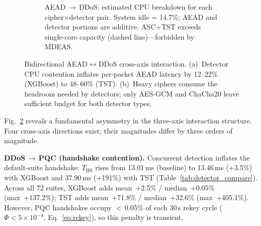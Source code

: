 \begin{figure}[t]
\begin{subfigure}[b]{\columnwidth}
{}%
\caption{AEAD\,$\to$\,DDoS: estimated CPU breakdown for each
  cipher$\times$detector pair.  System idle = 14.7\%; AEAD and
  detector portions are additive.  ASC+TST exceeds single-core
  capacity (dashed line)---forbidden by MDEAS.}
\label{fig:aead_to_ddos}
\end{subfigure}
\caption{Bidirectional AEAD$\leftrightarrow$DDoS cross-axis
  interaction.  (a)~Detector CPU contention inflates per-packet
  AEAD latency by 12--22\% (XGBoost) to 48--60\% (TST).
  (b)~Heavy ciphers consume the headroom needed by detectors;
  only AES-GCM and ChaCha20 leave sufficient budget for both
  detector types.}
\label{fig:cross_axis}
\end{figure}

Fig.~\ref{fig:cross_axis} reveals a fundamental asymmetry in the
three-axis interaction structure.  Four cross-axis directions exist;
their magnitudes differ by three orders of magnitude.

\medskip
\textbf{DDoS\,$\to$\,PQC (handshake contention).}\quad
Concurrent detection inflates the default-suite handshake:
$T_\text{HS}$ rises from 13.01\,ms (baseline) to 13.46\,ms
(+3.5\%) with XGBoost and 37.90\,ms (+191\%) with TST
(Table~\ref{tab:detector_compare}).  Across all 72 suites, XGBoost
adds mean~+2.5\% / median~+0.05\% (max~+137.2\%); TST
adds mean~+71.8\% / median~+32.6\% (max~+405.1\%).  However,
PQC handshakes occupy $<$\,0.05\% of each 30\,s rekey cycle
($\Phi < 5 \times 10^{-4}$, Eq.~\ref{eq:rekey}), so this penalty
is transient.

